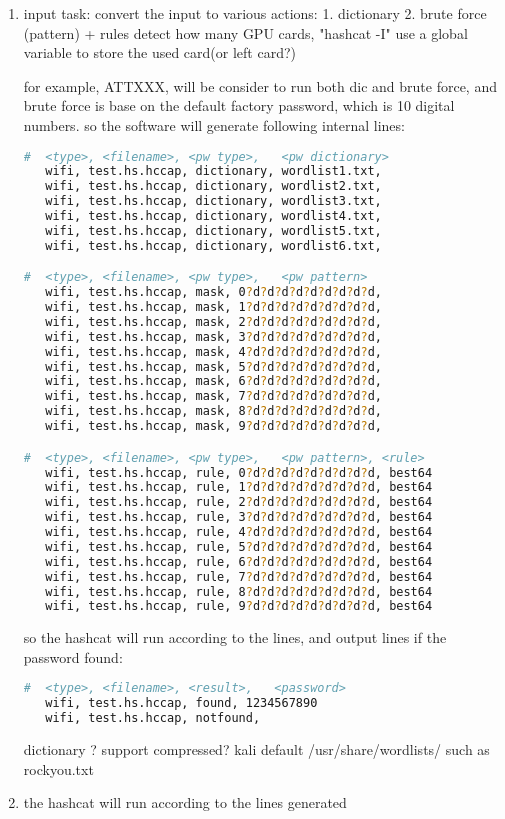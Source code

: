 \begin{enumerate}
  \item input task:
  convert the input to various actions:
 1. dictionary
 2. brute force (pattern) + rules
 detect how many GPU cards, "hashcat -I"
 use a global variable to store the used card(or left card?)

 for example, ATTXXX, will be consider to run both dic and brute force,
 and brute force is base on the default factory password, which is 10 digital numbers.
 so the software will generate following internal lines:

\begin{lstlisting}[language=bash]
#  <type>, <filename>, <pw type>,   <pw dictionary>
   wifi, test.hs.hccap, dictionary, wordlist1.txt,
   wifi, test.hs.hccap, dictionary, wordlist2.txt,
   wifi, test.hs.hccap, dictionary, wordlist3.txt,
   wifi, test.hs.hccap, dictionary, wordlist4.txt,
   wifi, test.hs.hccap, dictionary, wordlist5.txt,
   wifi, test.hs.hccap, dictionary, wordlist6.txt,

#  <type>, <filename>, <pw type>,   <pw pattern>
   wifi, test.hs.hccap, mask, 0?d?d?d?d?d?d?d?d?d, 
   wifi, test.hs.hccap, mask, 1?d?d?d?d?d?d?d?d?d, 
   wifi, test.hs.hccap, mask, 2?d?d?d?d?d?d?d?d?d, 
   wifi, test.hs.hccap, mask, 3?d?d?d?d?d?d?d?d?d, 
   wifi, test.hs.hccap, mask, 4?d?d?d?d?d?d?d?d?d, 
   wifi, test.hs.hccap, mask, 5?d?d?d?d?d?d?d?d?d, 
   wifi, test.hs.hccap, mask, 6?d?d?d?d?d?d?d?d?d, 
   wifi, test.hs.hccap, mask, 7?d?d?d?d?d?d?d?d?d, 
   wifi, test.hs.hccap, mask, 8?d?d?d?d?d?d?d?d?d, 
   wifi, test.hs.hccap, mask, 9?d?d?d?d?d?d?d?d?d, 

#  <type>, <filename>, <pw type>,   <pw pattern>, <rule>
   wifi, test.hs.hccap, rule, 0?d?d?d?d?d?d?d?d?d, best64
   wifi, test.hs.hccap, rule, 1?d?d?d?d?d?d?d?d?d, best64
   wifi, test.hs.hccap, rule, 2?d?d?d?d?d?d?d?d?d, best64
   wifi, test.hs.hccap, rule, 3?d?d?d?d?d?d?d?d?d, best64
   wifi, test.hs.hccap, rule, 4?d?d?d?d?d?d?d?d?d, best64
   wifi, test.hs.hccap, rule, 5?d?d?d?d?d?d?d?d?d, best64
   wifi, test.hs.hccap, rule, 6?d?d?d?d?d?d?d?d?d, best64
   wifi, test.hs.hccap, rule, 7?d?d?d?d?d?d?d?d?d, best64
   wifi, test.hs.hccap, rule, 8?d?d?d?d?d?d?d?d?d, best64
   wifi, test.hs.hccap, rule, 9?d?d?d?d?d?d?d?d?d, best64
\end{lstlisting}

so the hashcat will run according to the lines, and output lines if the password found:
\begin{lstlisting}[language=bash]
#  <type>, <filename>, <result>,   <password>
   wifi, test.hs.hccap, found, 1234567890
   wifi, test.hs.hccap, notfound,
\end{lstlisting}

 dictionary
 ? support compressed?
 kali default /usr/share/wordlists/
   such as rockyou.txt

  \item the hashcat will run according to the lines generated
\end{enumerate}





